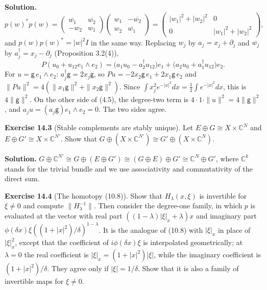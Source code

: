 \documentclass[
  11pt,
]{article}
\begin{document}
\textbf{Solution.} \[
p(w)^*p(w)=\begin{pmatrix}\overline{w_1}&\overline{w_2}\\-w_2&w_1\end{pmatrix}\begin{pmatrix}w_1&-\overline{w_2}\\w_2&\overline{w_1}\end{pmatrix}
=\begin{pmatrix}|w_1|^2+|w_2|^2&0\\0&|w_1|^2+|w_2|^2\end{pmatrix},
\] and \(p(w)p(w)^*=|w|^2I\) in the same way. Replacing \(w_j\) by
\(a_j=x_j+\partial_j\) and \(\overline{w_j}\) by
\(a_j^\dagger=x_j-\partial_j\) (Proposition 3.2(4)), \[
P(u_0+u_{12}e_1\wedge e_2)=\bigl(a_1u_0-a_2^\dagger u_{12}\bigr)e_1+\bigl(a_2u_0+a_1^\dagger u_{12}\bigr)e_2 .
\] For \(u=\mathsf g\,e_1\wedge e_2\):
\(a_j^\dagger\mathsf g=2x_j\mathsf g\), so
\(Pu=-2x_2\mathsf g\,e_1+2x_1\mathsf g\,e_2\) and
\(\|Pu\|^2=4(\|x_1\mathsf g\|^2+\|x_2\mathsf g\|^2)\). Since
\(\int x_j^2e^{-|x|^2}dx=\frac12\int e^{-|x|^2}dx\), this is
\(4\|\mathsf g\|^2\). On the other side of (4.5), the degree-two term is
\(4\cdot1\cdot\|u\|^2=4\|\mathsf g\|^2\), and
\(a_ju=(a_j\mathsf g)e_1\wedge e_2=0\). The two sides agree.

\textbf{Exercise 14.3} (Stable complements are stably unique). Let
\(E\oplus G\cong X\times\mathbb C^N\) and
\(E\oplus G'\cong X\times\mathbb C^{N'}\). Show that
\(G\oplus(X\times\mathbb C^{N'})\cong G'\oplus(X\times\mathbb C^N)\).

\textbf{Solution.}
\(G\oplus\mathbb C^{N'}\cong G\oplus(E\oplus G')\cong(G\oplus E)\oplus G'\cong\mathbb C^N\oplus G'\),
where \(\mathbb C^k\) stands for the trivial bundle and we use
associativity and commutativity of the direct sum.

\textbf{Exercise 14.4} (The homotopy (10.8)). Show that
\(H_\lambda(x,\xi)\) is invertible for \(\xi\ne0\) and compute
\(\|H_\lambda^{-1}\|\). Then consider the degree-one family, in which
\(p\) is evaluated at the vector with real part
\(((1-\lambda)|\xi|_x+\lambda)x\) and imaginary part
\(\phi(\delta x)\xi((1+|x|^2)/\delta)^{1-\lambda}\). It is the analogue
of (10.8) with \(|\xi|_x\) in place of \(|\xi|_x^2\), except that the
coefficient of \(i\phi(\delta x)\xi\) is interpolated geometrically; at
\(\lambda=0\) the real coefficient is \(|\xi|_x=(1+|x|^2)|\xi|\), while
the imaginary coefficient is \((1+|x|^2)/\delta\). They agree only if
\(|\xi|=1/\delta\). Show that it is also a family of invertible maps for
\(\xi\ne0\).
\end{document}
